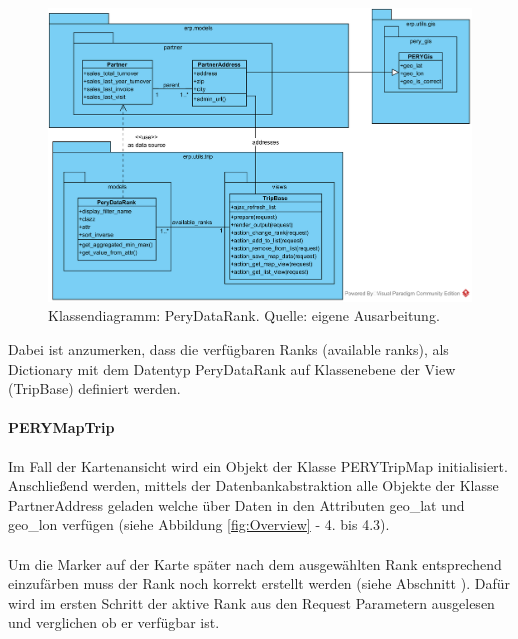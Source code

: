 \documentclass[Bachelorarbeit.tex]{subfiles}
\begin{document}
\begin{figure}[H]
\centering
\includegraphics[width=0.9\linewidth]{img/Implementierung/ClassDiagrammRank}
\caption[k]{Klassendiagramm: PeryDataRank. Quelle: eigene Ausarbeitung.}
\label{fig:ClassDiagrammRank}
\end{figure}

Dabei ist anzumerken, dass die verfügbaren Ranks (available ranks), als Dictionary mit dem Datentyp PeryDataRank auf Klassenebene der View (TripBase) definiert werden.

\paragraph{PERYMapTrip}
\label{PERYMapTrip}
Im Fall der Kartenansicht wird ein Objekt der Klasse PERYTripMap initialisiert. 
Anschließend werden, mittels der Datenbankabstraktion alle Objekte der Klasse PartnerAddress geladen welche über Daten in den Attributen geo\_lat und geo\_lon verfügen (siehe Abbildung \ref{fig:Overview} - 4. bis 4.3). \\
\\
Um die Marker auf der Karte später nach dem ausgewählten Rank entsprechend einzufärben muss der Rank noch korrekt erstellt werden (siehe Abschnitt ). 
Dafür wird im ersten Schritt der aktive Rank aus den Request Parametern ausgelesen und verglichen ob er verfügbar ist.
\end{document}
